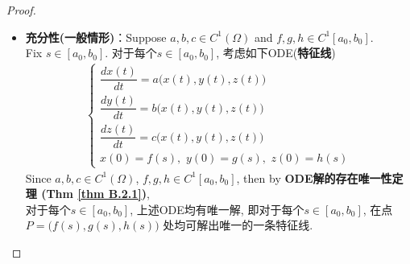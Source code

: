 \begin{thm}
		\begin{proof}
			\begin{itemize}
				\item \textbf{充分性(一般情形)}：Suppose $a , b , c \in C^1(\Omega)$ and $f , g , h \in C^1[a_0 , b_0]$. \\
				Fix $s \in [a_0 , b_0]$. 对于每个$s \in [a_0 , b_0]$, 考虑如下ODE(\textbf{特征线})
				\begin{align*}
					\begin{cases}
						\dfrac{dx(t)}{dt} = a \Big( x(t) , y(t) , z(t) \Big) \\
						\dfrac{dy(t)}{dt} = b \Big( x(t) , y(t) , z(t) \Big) \\
						\dfrac{dz(t)}{dt} = c \Big( x(t) , y(t) , z(t) \Big) \\
						x(0) = f(s) , \,\, y(0) = g(s) , \,\, z(0) = h(s)
					\end{cases}
				\end{align*}
				Since $a , b , c \in C^1(\Omega)$, $f , g , h \in C^1[a_0 , b_0]$, then by \textbf{ODE解的存在唯一性定理 (Thm \ref{thm B.2.1})}, \\
				对于每个$s \in [a_0 , b_0]$, 上述ODE均有唯一解, 即对于每个$s \in [a_0 , b_0]$, 在点$P = \Big( f(s) , g(s) , h(s) \Big)$ 处均可解出唯一的一条特征线. 
				
				\newpage
				

\end{itemize}
\end{proof}
\end{thm}
